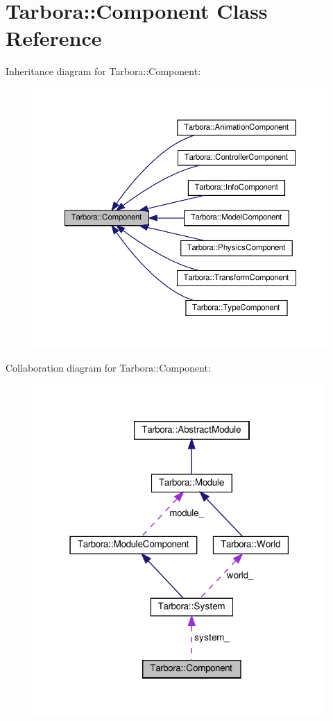 \hypertarget{classTarbora_1_1Component}{}\section{Tarbora\+:\+:Component Class Reference}
\label{classTarbora_1_1Component}


Inheritance diagram for Tarbora\+:\+:Component\+:
\nopagebreak
\begin{figure}[H]
\begin{center}
\leavevmode
\includegraphics[width=350pt]{classTarbora_1_1Component__inherit__graph}
\end{center}
\end{figure}


Collaboration diagram for Tarbora\+:\+:Component\+:
\nopagebreak
\begin{figure}[H]
\begin{center}
\leavevmode
\includegraphics[width=316pt]{classTarbora_1_1Component__coll__graph}
\end{center}
\end{figure}

